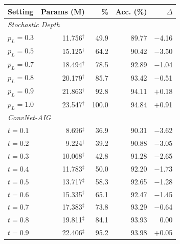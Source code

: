 \begin{table}[t]
\begin{minipage}[t]{0.48\textwidth}
\begin{tabular}[t]{@{}lrrrr@{}}
      \toprule
      Setting & Params (M) & \% & Acc. (\%) & $\Delta$ \\
      \midrule
      \multicolumn{5}{l}{\textit{Stochastic Depth}} \\
      $p_L=0.3$ & 11.756$^\dagger$ & 49.9 & 89.77 & $-$4.16 \\
      $p_L=0.5$ & 15.125$^\dagger$ & 64.2 & 90.42 & $-$3.50 \\
      $p_L=0.7$ & 18.494$^\dagger$ & 78.5 & 92.89 & $-$1.04 \\
      $p_L=0.8$ & 20.179$^\dagger$ & 85.7 & 93.42 & $-$0.51 \\
      $p_L=0.9$ & 21.863$^\dagger$ & 92.8 & 94.11 & $+$0.18 \\
      $p_L=1.0$ & 23.547$^\dagger$ & 100.0 & 94.84 & $+$0.91 \\
      \midrule
      \multicolumn{5}{l}{\textit{ConvNet-AIG}} \\
      $t=0.1$ & 8.696$^\ddagger$ & 36.9 & 90.31 & $-$3.62 \\
      $t=0.2$ & 9.224$^\ddagger$ & 39.2 & 90.88 & $-$3.05 \\
      $t=0.3$ & 10.068$^\ddagger$ & 42.8 & 91.28 & $-$2.65 \\
      $t=0.4$ & 11.783$^\ddagger$ & 50.0 & 92.20 & $-$1.73 \\
      $t=0.5$ & 13.717$^\ddagger$ & 58.3 & 92.65 & $-$1.28 \\
      $t=0.6$ & 15.335$^\ddagger$ & 65.1 & 92.47 & $-$1.45 \\
      $t=0.7$ & 17.383$^\ddagger$ & 73.8 & 93.29 & $-$0.64 \\
      $t=0.8$ & 19.811$^\ddagger$ & 84.1 & 93.93 & 0.00 \\
      $t=0.9$ & 22.406$^\ddagger$ & 95.2 & 93.98 & $+$0.05 \\
      \bottomrule
    \end{tabular}
  \end{minipage}
\end{table}
